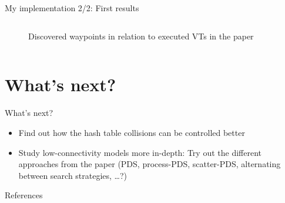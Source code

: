 \documentclass[aspectratio=169]{beamer}
\begin{document}
\begin{frame}{My implementation 2/2: First results}
\begin{columns}
\begin{column}{.5\textwidth}
\begin{figure}
                \caption{Discovered waypoints in relation to executed VTs in the paper}
                \label{fig:paper-discovered-states-executed-vts}
            \end{figure}
        \end{column}
    \end{columns}
\end{frame}

\section{What's next?}

\begin{frame}{What's next?}
    \begin{itemize}
        \item Find out how the hash table collisions can be controlled better
        \item Study low-connectivity models more in-depth: Try out the different approaches from the paper (PDS, process-PDS, scatter-PDS, alternating between search strategies, …?)
    \end{itemize}
\end{frame}

\appendix

\begin{frame}{References} %
    \printbibliography[heading=none]
\end{frame}
\end{document}
